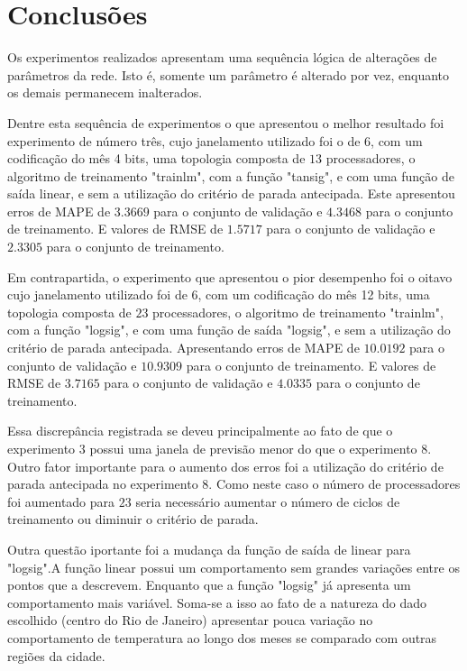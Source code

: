 \documentclass[journal, a4paper]{IEEEtran}
\begin{document}
\section{Conclusões}


Os experimentos realizados apresentam uma sequência lógica de alterações de parâmetros da rede. Isto é, somente um parâmetro é alterado por vez, enquanto os demais permanecem inalterados. 

Dentre esta sequência de experimentos o que apresentou o melhor resultado foi experimento de número três, cujo janelamento utilizado foi o de 6, com um codificação do mês 4 bits, uma topologia composta de $13$ processadores, o algoritmo de treinamento "trainlm", com a função "tansig", e com uma função de saída linear, e sem a utilização do critério de parada antecipada.  Este apresentou erros de MAPE de $3.3669$ para o conjunto de validação e $4.3468$ para o conjunto de treinamento. E valores de RMSE de $1.5717$ para o conjunto de validação e $2.3305$ para o conjunto de treinamento.

Em contrapartida, o experimento que apresentou o pior desempenho foi o oitavo cujo janelamento utilizado foi de 6, com um codificação do mês 12 bits, uma topologia composta de $23$ processadores, o algoritmo de treinamento "trainlm", com a função "logsig", e com uma função de saída "logsig", e sem a utilização do critério de parada antecipada. Apresentando erros de MAPE de $10.0192$ para o conjunto de validação e $10.9309$ para o conjunto de treinamento. E valores de RMSE de $3.7165$ para o conjunto de validação e $4.0335$ para o conjunto de treinamento.

Essa discrepância registrada se deveu principalmente ao fato de que o experimento $3$ possui uma janela de previsão menor do que o experimento $8$. Outro fator importante para o aumento dos erros foi a utilização do critério de parada antecipada no experimento $8$. Como neste caso o número de processadores foi aumentado para $23$ seria necessário aumentar o número de ciclos de treinamento ou diminuir o critério de parada. 

Outra questão iportante foi a mudança da função de saída de linear para "logsig".A função linear possui um comportamento sem grandes variações entre os pontos que a descrevem. Enquanto que a função "logsig" já apresenta um comportamento mais variável. Soma-se a isso ao fato de a natureza do dado escolhido (centro do Rio de Janeiro) apresentar pouca variação no comportamento de temperatura ao longo dos meses se comparado com outras regiões da cidade. 







\end{document}
